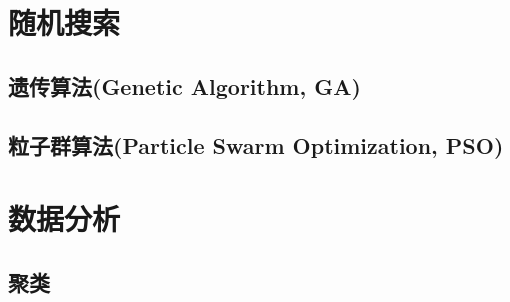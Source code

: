 \documentclass[a4paper,11pt,oneside]{book}
\begin{document}
\chapter{随机搜索}
\section{遗传算法(Genetic Algorithm, GA)}
\section{粒子群算法(Particle Swarm Optimization, PSO)}

\chapter{数据分析}
\section{聚类}

\backmatter


\end{document}
